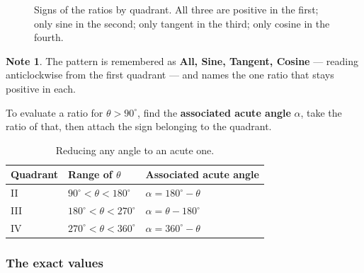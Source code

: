 \documentclass[11pt,a4paper]{article}
\theoremstyle{definition}
\newtheorem{note}[thm]{Note}
\begin{document}
\begin{figure}[H]
\centering
{}
\caption{Signs of the ratios by quadrant. All three are positive in the first; only sine in the second; only tangent in the third; only cosine in the fourth.}
\end{figure}

\begin{note}
The pattern is remembered as \textbf{All, Sine, Tangent, Cosine} --- reading
anticlockwise from the first quadrant --- and names the one ratio that stays positive
in each.
\end{note}

To evaluate a ratio for $\theta>90^\circ$, find the \textbf{associated acute angle}
$\alpha$, take the ratio of that, then attach the sign belonging to the quadrant.

\begin{table}[H]
\centering
\begin{tabular}{|l|l|l|}
\hline
Quadrant & Range of $\theta$ & Associated acute angle\\
\hline
II & $90^\circ<\theta<180^\circ$ & $\alpha=180^\circ-\theta$\\
III & $180^\circ<\theta<270^\circ$ & $\alpha=\theta-180^\circ$\\
IV & $270^\circ<\theta<360^\circ$ & $\alpha=360^\circ-\theta$\\
\hline
\end{tabular}
\caption{Reducing any angle to an acute one.}
\end{table}

\subsubsection{The exact values}
\end{document}
